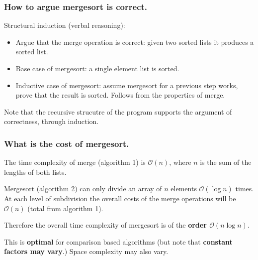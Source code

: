 \documentclass{beamer} %
\newcommand\emc[1]{\textcolor{brightblue}{\textbf{#1}}}
\begin{document}

\begin{frame}
\frametitle{How to argue mergesort is correct.}

Structural induction (verbal reasoning): 
\begin{itemize}
	\item Argue that the merge operation is correct: given two sorted lists it produces a sorted list.
	\item Base case of mergesort: a single element list is sorted.
	\item Inductive case of mergesort: assume mergesort for a previous step works, prove that the result is sorted. Follows from the properties of merge.
\end{itemize}

\vspace{3mm}
Note that the recursive strucutre of the program supports the argument of correctness, through induction.

\end{frame}

\begin{frame}
\frametitle{What is the cost of mergesort.}

The time complexity of merge (algorithm 1) is $\mathcal{O}(n)$, where $n$ is the sum of the lengths of both lists.

\vspace{3mm}

Mergesort (algorithm 2) can only divide an array of $n$ elements $\mathcal{O}(\log n)$ times. At each level of subdivision the overall costs of the merge operations will be $\mathcal{O}(n)$ (total from algorithm 1).

\vspace{3mm}
Therefore the overall time complexity of mergesort is of the \emc{order $\mathcal{O}(n \log n)$}. 

\vspace{3mm}
This is \emc{optimal} for comparison based algorithms (but note that \emc{constant factors may vary}.) Space complexity may also vary.

\end{frame}
\end{document}
